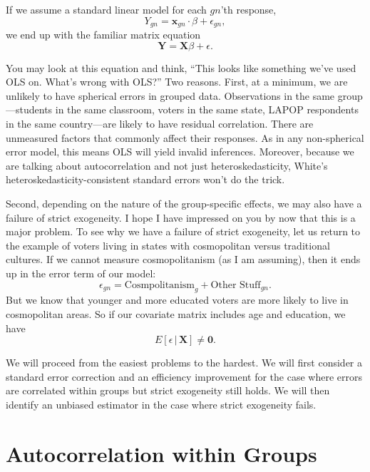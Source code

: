 \documentclass[12pt,oneside,openany]{book}
\begin{document}
If we assume a standard linear model for each \(gn\)'th response, \[
Y_{gn} = \mathbf{x}_{gn} \cdot \beta + \epsilon_{gn},
\] we end up with the familiar matrix equation \[
\mathbf{Y} = \mathbf{X} \beta + \epsilon.
\]

You may look at this equation and think, ``This looks like something
we've used OLS on. What's wrong with OLS?'' Two reasons. First, at a
minimum, we are unlikely to have spherical errors in grouped data.
Observations in the same group---students in the same classroom, voters
in the same state, LAPOP respondents in the same country---are likely to
have residual correlation. There are unmeasured factors that commonly
affect their responses. As in any non-spherical error model, this means
OLS will yield invalid inferences. Moreover, because we are talking
about autocorrelation and not just heteroskedasticity, White's
heteroskedasticity-consistent standard errors won't do the trick.

Second, depending on the nature of the group-specific effects, we may
also have a failure of strict exogeneity. I hope I have impressed on you
by now that this is a major problem. To see why we have a failure of
strict exogeneity, let us return to the example of voters living in
states with cosmopolitan versus traditional cultures. If we cannot
measure cosmopolitanism (as I am assuming), then it ends up in the error
term of our model: \[
\epsilon_{gn} = \text{Cosmpolitanism}_g + \text{Other Stuff}_{gn}.
\] But we know that younger and more educated voters are more likely to
live in cosmopolitan areas. So if our covariate matrix includes age and
education, we have \[
E[\epsilon \,|\, \mathbf{X}] \neq \mathbf{0}.
\]

We will proceed from the easiest problems to the hardest. We will first
consider a standard error correction and an efficiency improvement for
the case where errors are correlated within groups but strict exogeneity
still holds. We will then identify an unbiased estimator in the case
where strict exogeneity fails.

\section{Autocorrelation within
Groups}\label{autocorrelation-within-groups}

\providecommand{\Cor}{\mathop{\rm Cor}\nolimits}
\providecommand{\se}{\mathop{\rm se}\nolimits}
\end{document}
